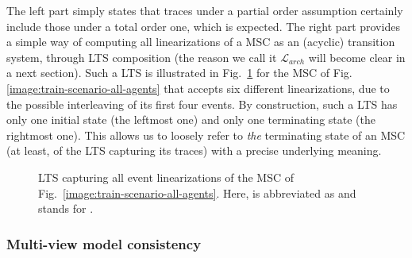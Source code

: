 The left part simply states that traces under a partial order assumption certainly include those under a total order one, which is expected. The right part provides a simple way of computing all linearizations of a MSC as an (acyclic) transition system, through LTS composition (the reason we call it $\mathcal{L}_{arch}$ will become clear in a next section). Such a LTS is illustrated in Fig.~\ref{image:msc-linearizations} for the MSC of Fig.\ref{image:train-scenario-all-agents} that accepts six different linearizations, due to the possible interleaving of its first four events. By construction, such a LTS has only one initial state (the leftmost one) and only one terminating state (the rightmost one). This allows us to loosely refer to \emph{the} terminating state of an MSC (at least, of the LTS capturing its traces) with a precise underlying meaning.


\begin{figure}\centering
{}
\caption{LTS capturing all event linearizations of the MSC of Fig.~\ref{image:train-scenario-all-agents}. Here,  is abbreviated as  and  stands for . \label{image:msc-linearizations}}
\end{figure}

\subsubsection*{Multi-view model consistency}

